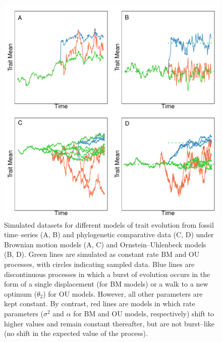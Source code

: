 \begin{figure}[p]
\centering
\includegraphics[width=\textwidth]{figs/Pennell_TREE-fig-box1}
\caption[Trait data simulated under alternative models]{Simulated datasets for different models of trait evolution from fossil time--series (A, B) and phylogenetic comparative data (C, D) under Brownian motion models (A, C) and Ornstein--Uhlenbeck models (B, D). Green lines are simulated as constant rate BM and OU processes, with circles indicating sampled data. Blue lines are discontinuous processes in which a burst of evolution occurs in the form of a single displacement (for BM models) or a walk to a new optimum ($\theta_2$) for OU models. However, all other parameters are kept constant. By contrast, red lines are models in which rate parameters ($\sigma^2$ and $\alpha$ for BM and OU models, respectively) shift to higher values and remain constant thereafter, but are not burst--like (no shift in the expected value of the process).  
}
\label{fig:pe-box1}
\end{figure}

